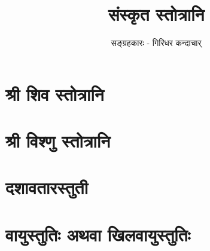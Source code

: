 \documentclass[twoside,a5paper]{report}
\title{\Huge \sanskrit संस्कृत स्तोत्रानि}
\author{\small \sanskrit सङ्ग्रहकारः - गिरिधर कन्दाचार्}
\newcommand*\NewPage{\newpage\null\thispagestyle{empty}\newpage}
\begin{document}
\renewcommand{\chaptername}{\Huge \color{blue}\sanskrit अध्याय}
\maketitle
\NewPage
{}
\tableofcontents
{}
\chapter{\color{orange}\sanskrit श्री शिव स्तोत्रानि }


\chapter{\color{orange}\sanskrit श्री विश्णु स्तोत्रानि }


\chapter{\color{orange}\sanskrit दशावतारस्तुती }


\chapter{\color{orange}\sanskrit वायुस्तुतिः अथवा खिलवायुस्तुतिः  }

\end{document}
